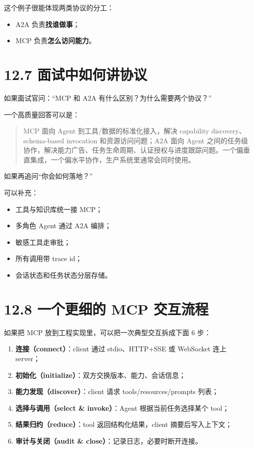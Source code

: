 这个例子很能体现两类协议的分工：


\begin{itemize}[leftmargin=2em]
\item A2A 负责\textbf{找谁做事}；
\item MCP 负责\textbf{怎么访问能力}。
\end{itemize}

\section{12.7 面试中如何讲协议}

如果面试官问：``MCP 和 A2A 有什么区别？为什么需要两个协议？''


一个高质量回答可以是：


\begin{quote}
MCP 面向 Agent 到工具/数据的标准化接入，解决 capability discovery、schema-based invocation 和资源访问问题；A2A 面向 Agent 之间的任务级协作，解决能力广告、任务生命周期、认证授权与进度跟踪问题。一个偏垂直集成，一个偏水平协作，生产系统里通常会同时使用。\\
\end{quote}

如果再追问``你会如何落地？''


可以补充：


\begin{itemize}[leftmargin=2em]
\item 工具与知识库统一接 MCP；
\item 多角色 Agent 通过 A2A 编排；
\item 敏感工具走审批；
\item 所有调用带 trace id；
\item 会话状态和任务状态分层存储。
\end{itemize}

\section{12.8 一个更细的 MCP 交互流程}

如果把 MCP 放到工程实现里，可以把一次典型交互拆成下面 6 步：


\begin{enumerate}[leftmargin=2em]
\item \textbf{连接（connect）}：client 通过 stdio、HTTP+SSE 或 WebSocket 连上 server；
\item \textbf{初始化（initialize）}：双方交换版本、能力、会话信息；
\item \textbf{能力发现（discover）}：client 请求 tools/resources/prompts 列表；
\item \textbf{选择与调用（select \& invoke）}：Agent 根据当前任务选择某个 tool；
\item \textbf{结果归约（reduce）}：tool 返回结构化结果，client 摘要后写入上下文；
\item \textbf{审计与关闭（audit \& close）}：记录日志，必要时断开连接。
\end{enumerate}

